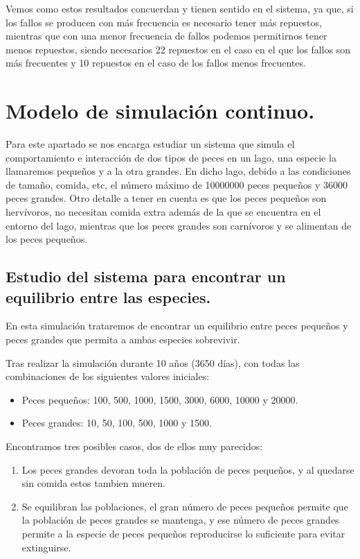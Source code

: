 \documentclass[12pt, spanish]{article}
\begin{document}
Vemos como estos resultados concuerdan y tienen sentido en el sistema, ya que, si los fallos se producen con más frecuencia es necesario tener más repuestos, mientras que con una menor frecuencia de fallos podemos permitirnos tener menos repuestos, siendo necesarios 22 repuestos en el caso en el que los fallos son más frecuentes y 10 repuestos en el caso de los fallos menos frecuentes.


\newpage

\section{Modelo de simulación continuo.}

Para este apartado se nos encarga estudiar un sistema que simula el comportamiento e interacción de dos tipos de peces en un lago, una especie la llamaremos pequeños y a la otra grandes. En dicho lago, debido a las condiciones de tamaño, comida, etc, el número máximo de 10000000 peces pequeños y 36000 peces grandes. Otro detalle a tener en cuenta es que los peces pequeños son hervívoros, no necesitan comida extra además de la que se encuentra en el entorno del lago, mientras que los peces grandes son carnívoros y se alimentan de los peces pequeños.

\subsection{Estudio del sistema para encontrar un equilibrio entre las especies.}

En esta simulación trataremos de encontrar un equilibrio entre peces pequeños y peces grandes que permita a ambas especies sobrevivir.

Tras realizar la simulación durante 10 años (3650 días), con todas las combinaciones de los siguientes valores iniciales:

\begin{itemize}
	\item Peces pequeños: 100, 500, 1000, 1500, 3000, 6000, 10000 y 20000.
	\item Peces grandes: 10, 50, 100, 500, 1000 y 1500.
\end{itemize}

Encontramos tres posibles casos, dos de ellos muy parecidos:

\begin{enumerate}
	\item Los peces grandes devoran toda la población de peces pequeños, y al quedarse sin comida estos tambien mueren.
	\item Se equilibran las poblaciones, el gran número de peces pequeños permite que la población de peces grandes se mantenga, y ese número de peces grandes permite a la especie de peces pequeños reproducirse lo suficiente para evitar extinguirse.
\end{enumerate}
\end{document}
